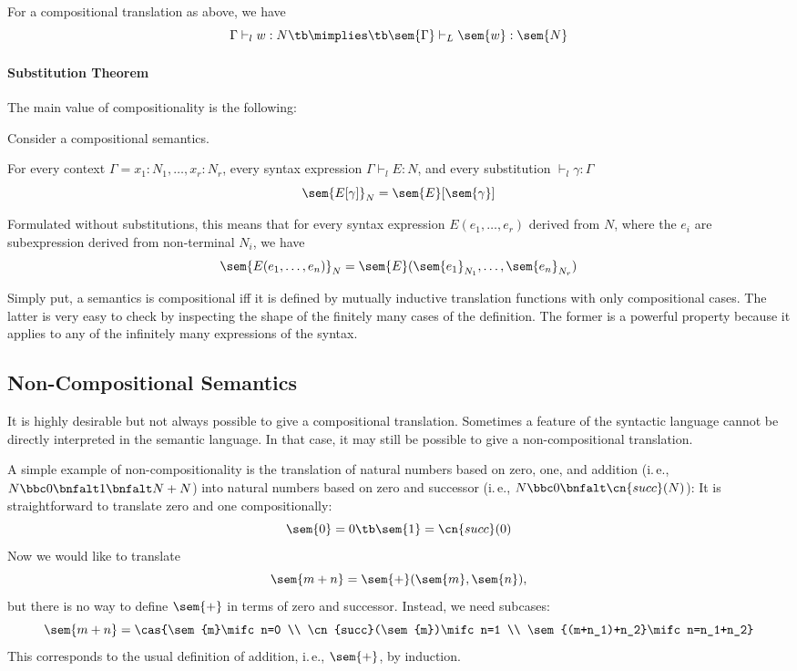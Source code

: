\begin{theorem}
For a compositional translation as above, we have
  \[\Gamma\vdash_l w:N \tb\mimplies\tb \sem{\Gamma}\vdash_L \sem{w}:\sem{N}\]
\end{theorem}

\paragraph{Substitution Theorem}
The main value of compositionality is the following:
\begin{theorem}
Consider a compositional semantics.

For every context $\Gamma=x_1:N_1,\ldots,x_r:N_r$, every syntax expression $\Gamma \vdash_l E:N$,
and every substitution $\vdash_l \gamma:\Gamma$
\[\sem{E[\gamma]}_N=\sem{E}[\sem{\gamma}]\]
\end{theorem}

Formulated without substitutions, this means that for every syntax expression $E(e_1,\ldots,e_r)$ derived from $N$, where the $e_i$ are subexpression derived from non-terminal $N_i$, we have
\[\sem{E(e_1,\ldots,e_n)}_N=\sem{E}(\sem{e_1}_{N_1},\ldots,\sem{e_n}_{N_r})\]

Simply put, a semantics is compositional iff it is defined by mutually inductive translation functions with only compositional cases.
The latter is very easy to check by inspecting the shape of the finitely many cases of the definition.
The former is a powerful property because it applies to any of the infinitely many expressions of the syntax.

\subsection{Non-Compositional Semantics}

It is highly desirable but not always possible to give a compositional translation.
Sometimes a feature of the syntactic language cannot be directly interpreted in the semantic language.
In that case, it may still be possible to give a non-compositional translation.

\begin{example}
A simple example of non-compositionality is the translation of natural numbers based on zero, one, and addition (i.\,e., $N\bbc 0\bnfalt 1\bnfalt N+N$) into natural numbers based on zero and successor (i.\,e., $N\bbc 0\bnfalt\cn{succ}(N)$):
It is straightforward to translate zero and one compositionally:
\[\sem{0}=0 \tb\sem{1}=\cn{succ}(0)\]
Now we would like to translate \[\sem{m+n}=\sem{+}(\sem{m},\sem{n}),\] but there is no way to define $\sem{+}$ in terms of zero and successor.
Instead, we need subcases:
\[\sem{m+n}=\cas{\sem{m}\mifc n=0 \\ \cn{succ}(\sem{m})\mifc n=1 \\ \sem{(m+n_1)+n_2}\mifc n=n_1+n_2}\]
This corresponds to the usual definition of addition, i.\,e., $\sem{+}$, by induction.
\end{example}

